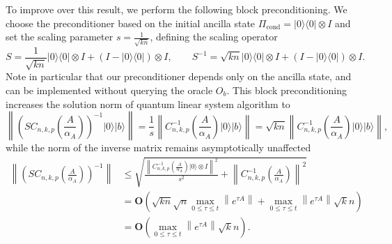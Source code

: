 \documentclass[letterpaper,onecolumn,11pt,accepted=2026-02-14]{quantumarticle}
\newcommand{\norm}[1]{\left\lVert#1\right\rVert}
\theoremstyle{remark}
\theoremstyle{plain}
\newcommand{\ket}[1]{|#1\rangle}
\newcommand{\bra}[1]{\langle#1|}
\newcommand{\ketbra}[2]{\ket{#1}\!\bra{#2}}
\begin{document}
To improve over this result, we perform the following block preconditioning. We choose the preconditioner based on the initial ancilla state $\Pi_{\text{cond}}=\ketbra{0}{0}\otimes I$ and set the scaling parameter $s=\frac{1}{\sqrt{kn}}$, defining the scaling operator
\begin{equation}
    S=\frac{1}{\sqrt{kn}}\ketbra{0}{0}\otimes I+\left(I-\ketbra{0}{0}\right)\otimes I,\qquad
    S^{-1}=\sqrt{kn}\ketbra{0}{0}\otimes I+\left(I-\ketbra{0}{0}\right)\otimes I.
\end{equation}
Note in particular that our preconditioner depends only on the ancilla state, and can be implemented without querying the oracle $O_{b}$.
This block preconditioning increases the solution norm of quantum linear system algorithm to
\begin{equation}
    \norm{\left(SC_{n,k,p}\left(\frac{A}{\alpha_A}\right)\right)^{-1}\ket{0}\ket{b}}
    =\frac{1}{s}\norm{C_{n,k,p}^{-1}\left(\frac{A}{\alpha_A}\right)\ket{0}\ket{b}}
    =\sqrt{kn}\norm{C_{n,k,p}^{-1}\left(\frac{A}{\alpha_A}\right)\ket{0}\ket{b}},
\end{equation}
while the norm of the inverse matrix remains asymptotically unaffected
\begin{equation}
\begin{aligned}
    \norm{\left(SC_{n,k,p}\left(\frac{A}{\alpha_A}\right)\right)^{-1}}
    &\leq\sqrt{\frac{\norm{C_{n,k,p}^{-1}\left(\frac{A}{\alpha_A}\right)\ket{0}\otimes I}^2}{s^2}+\norm{C_{n,k,p}^{-1}\left(\frac{A}{\alpha_A}\right)}^2}\\
    &=\mathbf{O}\left(\sqrt{kn}\sqrt{n}\max_{0\leq\tau\leq t}\norm{e^{\tau A}}
    +\max_{0\leq\tau\leq t}\norm{e^{\tau A}}\sqrt{k}n\right)\\
    &=\mathbf{O}\left(\max_{0\leq\tau\leq t}\norm{e^{\tau A}}\sqrt{k}n\right).
\end{aligned}
\end{equation}
\end{document}
